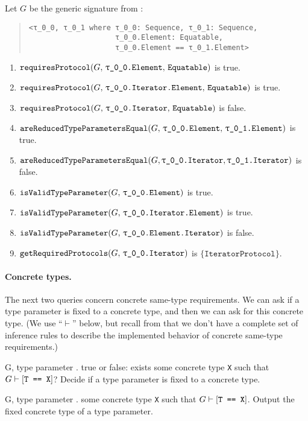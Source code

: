 \documentclass[../generics]{subfiles}
\begin{document}
\begin{example}
Let $G$ be the generic signature from :
\begin{quote}
\begin{verbatim}
<τ_0_0, τ_0_1 where τ_0_0: Sequence, τ_0_1: Sequence,
                    τ_0_0.Element: Equatable,
                    τ_0_0.Element == τ_0_1.Element>
\end{verbatim}
\end{quote}
\begin{enumerate}
\item $\Query{requiresProtocol}{G,\, \texttt{\rT.Element},\,\texttt{Equatable}}$ is true.
\item $\Query{requiresProtocol}{G,\, \texttt{\rT.Iterator.Element},\, \texttt{Equatable}}$ is true.
\item $\Query{requiresProtocol}{G,\, \texttt{\rT.Iterator},\, \texttt{Equatable}}$ is false.
\item $\Query{areReducedTypeParametersEqual}{G,\, \texttt{\rT.Element},\, \texttt{\rU.Element}}$ is true.
\item $\Query{areReducedTypeParametersEqual}{G, \texttt{\rT.Iterator}, \texttt{\rU.Iterator}}$ is false.
\item $\Query{isValidTypeParameter}{G,\, \texttt{\rT.Element}}$ is true.
\item $\Query{isValidTypeParameter}{G,\, \texttt{\rT.Iterator.Element}}$ is true.
\item $\Query{isValidTypeParameter}{G,\, \texttt{\rT.Element.Iterator}}$ is false.
\item $\Query{getRequiredProtocols}{G,\, \texttt{\rT.Iterator}}$ is $\{\texttt{IteratorProtocol}\}$.
\end{enumerate}
\end{example}

\paragraph{Concrete types.} The next two queries concern concrete same-type requirements. We can ask if a type parameter is fixed to a concrete type, and then we can ask for this concrete type. (We use ``$\vdash$'' below, but recall from  that we don't have a complete set of inference rules to describe the implemented behavior of concrete same-type requirements.)

\begin{itemize}
{G, \tT}
{type parameter \tT.}
{true or false: exists some concrete type \texttt{X} such that $G\vdash[\texttt{T == X}]$?}
{Decide if a type parameter is fixed to a concrete type.}

{G, \tT}
{type parameter \tT.}
{some concrete type \texttt{X} such that $G\vdash[\texttt{T == X}]$.}
{Output the fixed concrete type of a type parameter.}
\end{itemize}
\end{document}
